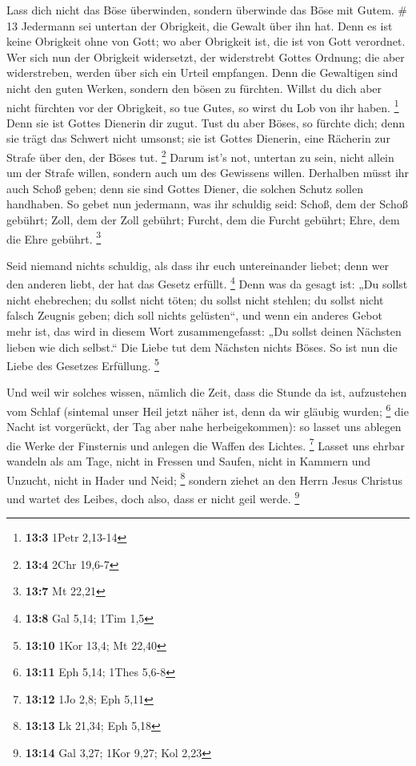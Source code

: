  Lass dich nicht das Böse überwinden, sondern überwinde
das Böse mit Gutem. \# 13  Jedermann sei untertan der
Obrigkeit, die Gewalt über ihn hat. Denn es ist keine Obrigkeit ohne von
Gott; wo aber Obrigkeit ist, die ist von Gott verordnet. 
Wer sich nun der Obrigkeit widersetzt, der widerstrebt Gottes Ordnung;
die aber widerstreben, werden über sich ein Urteil empfangen.
 Denn die Gewaltigen sind nicht den guten Werken, sondern
den bösen zu fürchten. Willst du dich aber nicht fürchten vor der
Obrigkeit, so tue Gutes, so wirst du Lob von ihr haben. \footnote{\textbf{13:3}
  1Petr 2,13-14}  Denn sie ist Gottes Dienerin dir zugut.
Tust du aber Böses, so fürchte dich; denn sie trägt das Schwert nicht
umsonst; sie ist Gottes Dienerin, eine Rächerin zur Strafe über den, der
Böses tut. \footnote{\textbf{13:4} 2Chr 19,6-7}  Darum
ist's not, untertan zu sein, nicht allein um der Strafe willen, sondern
auch um des Gewissens willen.  Derhalben müsst ihr auch
Schoß geben; denn sie sind Gottes Diener, die solchen Schutz sollen
handhaben.  So gebet nun jedermann, was ihr schuldig seid:
Schoß, dem der Schoß gebührt; Zoll, dem der Zoll gebührt; Furcht, dem
die Furcht gebührt; Ehre, dem die Ehre gebührt. \footnote{\textbf{13:7}
  Mt 22,21}

 Seid niemand nichts schuldig, als dass ihr euch
untereinander liebet; denn wer den anderen liebt, der hat das Gesetz
erfüllt. \footnote{\textbf{13:8} Gal 5,14; 1Tim 1,5}  Denn
was da gesagt ist: „Du sollst nicht ehebrechen; du sollst nicht töten;
du sollst nicht stehlen; du sollst nicht falsch Zeugnis geben; dich soll
nichts gelüsten``, und wenn ein anderes Gebot mehr ist, das wird in
diesem Wort zusammengefasst: „Du sollst deinen Nächsten lieben wie dich
selbst.``  Die Liebe tut dem Nächsten nichts Böses. So
ist nun die Liebe des Gesetzes Erfüllung. \footnote{\textbf{13:10} 1Kor
  13,4; Mt 22,40}

 Und weil wir solches wissen, nämlich die Zeit, dass die
Stunde da ist, aufzustehen vom Schlaf (sintemal unser Heil jetzt näher
ist, denn da wir gläubig wurden; \footnote{\textbf{13:11} Eph 5,14;
  1Thes 5,6-8}  die Nacht ist vorgerückt, der Tag aber
nahe herbeigekommen): so lasset uns ablegen die Werke der Finsternis und
anlegen die Waffen des Lichtes. \footnote{\textbf{13:12} 1Jo 2,8; Eph
  5,11}  Lasset uns ehrbar wandeln als am Tage, nicht in
Fressen und Saufen, nicht in Kammern und Unzucht, nicht in Hader und
Neid; \footnote{\textbf{13:13} Lk 21,34; Eph 5,18} 
sondern ziehet an den Herrn Jesus Christus und wartet des Leibes, doch
also, dass er nicht geil werde. \footnote{\textbf{13:14} Gal 3,27; 1Kor
  9,27; Kol 2,23}

